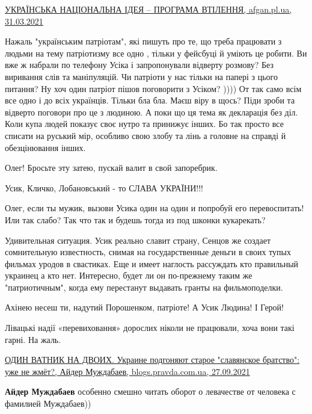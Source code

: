 \begin{itemize}
\href{http://afgan.pl.ua/uk/content/ukraЇnska-natsІonalna-Іdeya-–-programa-vtІlennya}{%
УКРАЇНСЬКА НАЦІОНАЛЬНА ІДЕЯ – ПРОГРАМА ВТІЛЕННЯ, afgan.pl.ua, 31.03.2021%
}


Нажаль "українським патріотам", які пишуть про те, що треба працювати з людьми
на тему патріотизму все одно , тільки у фейсбуці й уміють це робити. Ви вже ж
набрали по телефону Усіка і запропонували відверту розмову? Без виривання слів
та маніпуляцій. Чи патріоти у нас тільки на папері з цього питання? Ну хоч один
патріот пішов поговорити з Усіком? )))) От так само всім все одно і до всіх
українців. Тільки бла бла. Маєш віру в щось? Піди зроби та відверто поговори
про це з людиною. А поки що ця тема як декларація без діл. Коли купа людей
показує своє нутро та принижує інших. Бо так просто все списати на руський мір,
особливо свою злобу та лінь а головне на справді й обезцінювання інших.


Олег! Бросьте эту затею, пускай валит в свой запоребрик.

Усик, Кличко, Лобановський - то СЛАВА УКРАЇНИ!!!


Олег, если ты мужик, вызови Усика один на один и попробуй его перевоспитать! Или
так слабо? Так что так и будешь тогда из под шконки кукарекать?



Удивительная ситуация. Усик реально славит страну, Сенцов же создает
сомнительную известность, снимая на государственные деньги в своих тупых
фильмах уродов в свастиках. Еще и имеет наглость рассуждать кто правильный
украинец а кто нет. Интересно, будет ли он по-прежнему таким же "патриотичным",
когда ему перестанут выдавать гранты на фильмоподелки.


Ахінею несеш ти, надутий Порошенком, патріоте! А Усик Людина! І Герой!


Лівацькі надії «перевиховання» дорослих ніколи не працювали, хоча вони такі гарні. На жаль.

\href{https://blogs.pravda.com.ua/authors/muzhdabaev/615199a366971/}{%
ОДИН ВАТНИК НА ДВОИХ. Украине подгоняют старое "славянское братство": уже не жмёт?, %
Айдер Муждабаев, blogs.pravda.com.ua, 27.09.2021%
}

\begin{itemize} %
\textbf{Айдер Муждабаев} особенно смешно читать оборот о левачестве от человека с фамилией Муждабаев))


\end{itemize}
\end{itemize}
